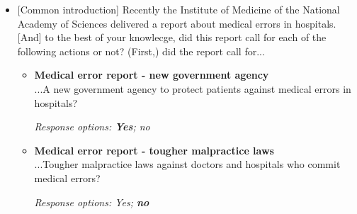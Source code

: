\documentclass[12pt, letterpaper]{article}
\begin{document}
\begin{itemize}
\item{[Common introduction] Recently the Institute of Medicine of the National Academy of Sciences delivered a report about medical errors in hospitals. [And] to the best of your knowlecge, did this report call for each of the following actions or not? (First,) did the report call for...

   \begin{itemize}
\item \textbf{Medical error report - new government agency} \\
...A new government agency to protect patients against medical errors in hospitals?

\textit{Response options: \textbf{Yes}; no}
\end{itemize}

   \begin{itemize}
\item \textbf{Medical error report - tougher malpractice laws} \\
...Tougher malpractice laws against doctors and hospitals who commit medical errors?

\textit{Response options: Yes; \textbf{no}}
\end{itemize}}
\end{itemize}
\end{document}
